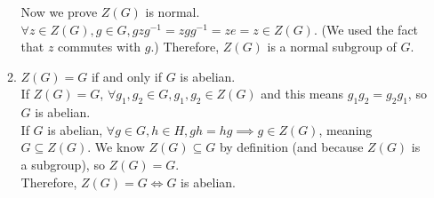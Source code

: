 \documentclass{amsart}
\begin{document}
\begin{enumerate}
\begin{enumerate}
    Now we prove $Z(G)$ is normal.\\

    $\forall z\in Z(G),g\in G,gzg^{-1}=zgg^{-1}=ze=z\in Z(G)$. (We used the fact that $z$ commutes with $g$.) Therefore, $Z(G)$ is a normal subgroup of $G$.\\ 

	\item $Z(G) = G$ if and only if $G$ is abelian.\\

    If $Z(G)=G$, $\forall g_1,g_2\in G,g_1,g_2\in Z(G)$ and this means $g_1g_2=g_2g_1$, so $G$ is abelian.\\

    If $G$ is abelian, $\forall g\in G,h\in H,gh=hg\implies g\in Z(G)$, meaning $G\subseteq Z(G)$. We know $Z(G)\subseteq G$ by definition (and because $Z(G)$ is a subgroup), so $Z(G)=G$.\\

    Therefore, $Z(G)=G\iff G$ is abelian.
\end{enumerate}



\end{enumerate}
\end{document}
